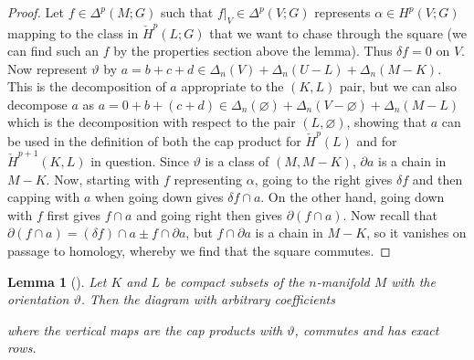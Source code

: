 \documentclass[reqno]{amsart}
\newtheorem{lemma}[theorem]{Lemma}
\theoremstyle{definition}
\theoremstyle{remark}
\begin{document}
\begin{proof}
          Let $f \in \Delta^{p} (M;G)$ such that
          $f|_{V} \in \Delta^{p}(V;G)$ represents
          $\alpha \in H^{p}(V;G)$ mapping to
          the class in $\check{H}^{p}(L;G)$ that we want
          to
          chase through the square (we can find such an $f$ by the
          properties section above the lemma).
          Thus $\delta f = 0$ on $V$.\\
          Now represent $\vartheta$ by $a = b+c+d \in 
          \Delta_n (V) + \Delta_n (U-L) + \Delta_n (M-K)$. This
          is the decomposition of $a$ appropriate to the
          $(K,L)$ pair, but we can also decompose
          $a$ as $a = 0 + b + (c+d) \in 
          \Delta_n (\varnothing) + \Delta_n (V - \varnothing)
          + \Delta_n (M - L)$ which is the decomposition
          with respect to the pair $(L, \varnothing)$, showing
          that $a$ can be used in the definition
          of both the cap product for
          $\check{H}^{p}(L)$ and for
          $\check{H}^{p+1}(K,L)$ in question. Since
          $\vartheta$ is a class of
          $(M, M-K)$, $\partial a$ is a chain in $M - K$. Now, starting
          with $f$ representing $\alpha$, going to the
          right gives $\delta f$ and then capping with $a$ when
          going down gives
          $\delta f \cap a$. On the other hand,
          going down with $f$ first gives $f \cap a$ and going
          right then gives $\partial \left( f \cap a \right) $.
          Now recall that
          $\partial \left( f \cap a \right) 
          = \left( \delta f \right) \cap a \pm f \cap \partial a$, but
          $f \cap \partial a$ is a chain in $M - K$, so it
          vanishes on passage to homology, whereby
          we find that the square commutes.
      \end{proof}


      \begin{lemma}[]
          Let $K$ and $L$ be compact subsets of the
          $n$-manifold $M$ with the orientation
          $\vartheta$. Then the diagram with arbitrary coefficients

      where the vertical maps are the cap products with
      $\vartheta$, commutes and has exact rows.
          
      \end{lemma}
\end{document}
